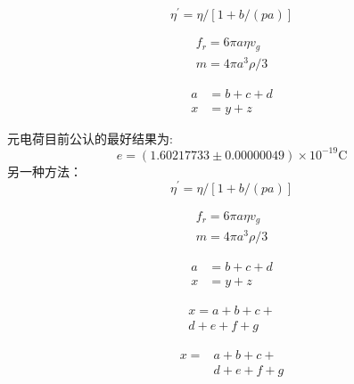 \documentclass[10pt,a4paper,twocolumn,twoside,UTF8]{ctexart}
\begin{document}
	\begin{equation}
	\eta^{\prime}=\eta /[1+b /(p a)]
	\end{equation}

	\begin{gather}
	f_r=6\pi a \eta v_g   \\
	m=4 \pi a^{3} \rho / 3
	\end{gather}

	\begin{align}
	a &= b+c+d \\
	x &= y+z
	\end{align}

	元电荷目前公认的最好结果为:
	\[e=(1.60217733 \pm 0.00000049) \times 10^{-19} \mathrm{C}\]
	另一种方法：
	\begin{equation*}
	\eta^{\prime}=\eta /[1+b /(p a)]
	\end{equation*}

	\begin{gather*}
	f_r=6\pi a \eta v_g   \\
	m=4 \pi a^{3} \rho / 3
	\end{gather*}

	\begin{align*}
	a &= b+c+d \\
	x &= y+z
	\end{align*}

	\begin{multline}
	x = a+b+c+{} \\
	d+e+f+g
	\end{multline}

	\[\begin{aligned}
	x ={}&a+b+c+{} \\
	&d+e+f+g
	\end{aligned}\]


\printbibliography[title=参考文献]%



\end{document}
